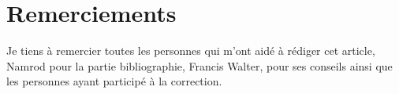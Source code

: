 
\thispagestyle{empty}
\chapter*{Remerciements}
Je tiens à remercier toutes les personnes qui m'ont aidé à rédiger cet article, Namrod pour la partie bibliographie, Francis Walter, pour ses conseils ainsi que les personnes ayant participé à la correction.
